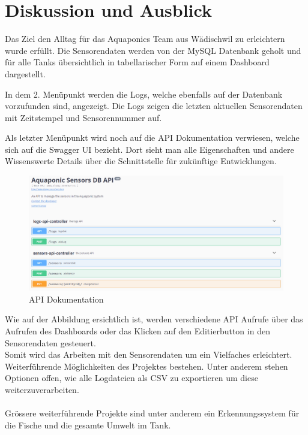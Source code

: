 \documentclass[../main.tex]{subfiles}
\begin{document}
	\section{Diskussion und Ausblick}
	
	Das Ziel den Alltag für das Aquaponics Team aus Wädischwil zu erleichtern wurde erfüllt.
	Die Sensorendaten werden von der MySQL Datenbank geholt und für alle Tanks übersichtlich in tabellarischer Form auf einem Dashboard dargestellt. \par \noindent
	In dem 2. Menüpunkt werden die Logs, welche ebenfalls auf der Datenbank vorzufunden sind, angezeigt. Die Logs zeigen die letzten aktuellen Sensorendaten mit Zeitstempel und Sensorennummer auf. \par \noindent
	Als letzter Menüpunkt wird noch auf die API Dokumentation verwiesen, welche sich auf die Swagger UI bezieht. Dort sieht man alle Eigenschaften und andere Wissenswerte Details über die Schnittstelle für zukünftige Entwicklungen.\par 
	\begin{figure}[H]
		\centering
		\includegraphics[scale=0.4]{../images/API_Documentation}
		\caption{API Dokumentation}
		\label{fig:API_Documentation}
	\end{figure}
	\noindent
	Wie auf der Abbildung ersichtlich ist, werden verschiedene API Aufrufe über das Aufrufen des Dashboards oder das Klicken auf den Editierbutton in den Sensorendaten gesteuert. 
	\\
	Somit wird das Arbeiten mit den Sensorendaten um ein Vielfaches erleichtert.
	\\
	Weiterführende Möglichkeiten des Projektes bestehen. Unter anderem stehen Optionen offen, wie alle Logdateien als CSV zu exportieren um diese weiterzuverarbeiten.
	\\ \\
	Grössere weiterführende Projekte sind unter anderem ein Erkennungssystem für die Fische und die gesamte Umwelt im Tank. \\
\end{document}
